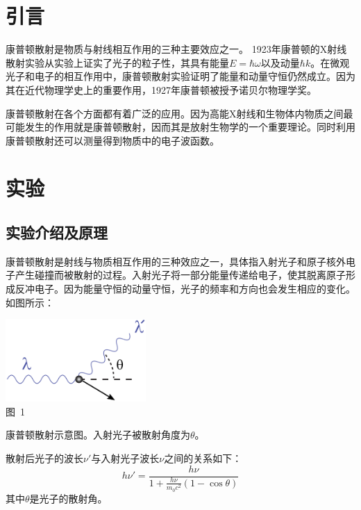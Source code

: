 \documentclass[a4paper,10.0pt,twoside]{npr}
\begin{document}
\begin{multicols}{2}

\section{引言}    %
\vspace*{-1mm}
\song\wuhao

康普顿散射是物质与射线相互作用的三种主要效应之一。 1923年康普顿的X射线散射实验从实验上证实了光子的粒子性，其具有能量$E=\hbar\omega$以及动量$\hbar k$。在微观光子和电子的相互作用中，康普顿散射实验证明了能量和动量守恒仍然成立。因为其在近代物理学史上的重要作用，1927年康普顿被授予诺贝尔物理学奖。

康普顿散射在各个方面都有着广泛的应用。因为高能X射线和生物体内物质之间最可能发生的作用就是康普顿散射，因而其是放射生物学的一个重要理论。同时利用康普顿散射还可以测量得到物质中的电子波函数。
\section{实验}
\subsection{实验介绍及原理}

康普顿散射是射线与物质相互作用的三种效应之一，具体指入射光子和原子核外电子产生碰撞而被散射的过程。入射光子将一部分能量传递给电子，使其脱离原子形成反冲电子。因为能量守恒的动量守恒，光子的频率和方向也会发生相应的变化。如图所示：

\begin{center}
   \includegraphics[width=0.4\textwidth]{CS.png}
\\
\xiaowu\song 图~1\begin{minipage}[t]{75mm} \quad 康普顿散射示意图。入射光子被散射角度为$\theta$。\\[-1mm]\wuhao
\end{minipage}
\end{center}

散射后光子的波长$\nu'$与入射光子波长$\nu$之间的关系如下：
\begin{equation}
   h\nu'=\frac{h\nu}{1+\frac{h\nu}{m_0c^2}(1-\cos{\theta})}
\end{equation}
其中$\theta$是光子的散射角。


\end{multicols}
\end{document}
